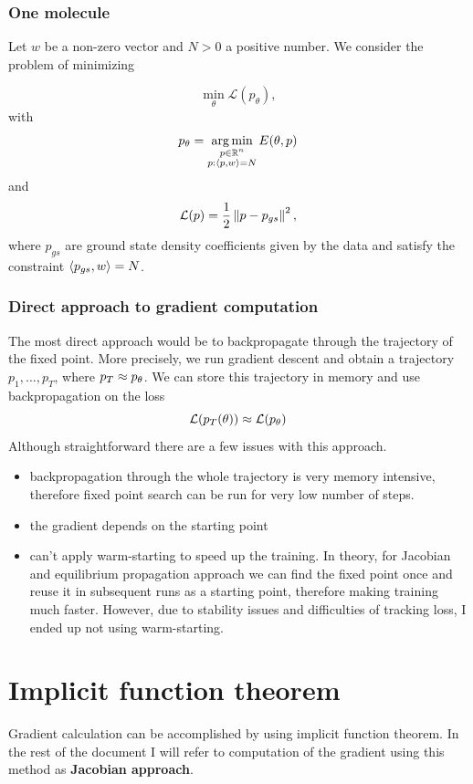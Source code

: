 \documentclass[a4paper,10pt]{report}
\begin{document}
\subsubsection{One molecule}
Let $w$ be a non-zero vector and $N>0$ a positive number.
We consider the problem of minimizing

\begin{equation}
 \min_\theta \mathcal{L}(p_\theta),
\end{equation}
with
\begin{equation}
p_\theta = \operatorname*{arg\,min}_{\substack{p \in \mathbb{R}^n \\ p: \langle p, w \rangle=N }} E(\theta, p)
\end{equation}
and
\begin{equation}
 \mathcal{L}(p) = \frac{1}{2} \left\|p-p_{gs}\right\|^2,
\end{equation}
where $p_{gs}$ are ground state density coefficients given by the data and satisfy the constraint $\langle p_{gs}, w \rangle = N$.


\subsubsection{Direct approach to gradient computation}
The most direct approach would be to backpropagate through the trajectory of the fixed point. More precisely, we run gradient descent and obtain a trajectory $p_1, \ldots, p_T$, where $p_T \approx p_\theta$. We can store this trajectory in memory and use backpropagation on the loss
\begin{equation}
 \mathcal{L}(p_T(\theta)) \approx \mathcal{L}(p_\theta)
\end{equation}
Although straightforward there are a few issues with this approach.
\begin{itemize}
 \item backpropagation through the whole trajectory is very memory intensive, therefore fixed point search can be run for very low number of steps.
 \item the gradient depends on the starting point
 \item can't apply warm-starting to speed up the training. In theory, for Jacobian and equilibrium propagation approach we can find the fixed point once and reuse it in subsequent runs as a starting point, therefore making training much faster.
 However, due to stability issues and difficulties of tracking loss, I ended up not using warm-starting.
\end{itemize}


\section{Implicit function theorem}
Gradient calculation can be accomplished by using implicit function theorem. In the rest of the document I will refer to computation of the gradient using this method as \textbf{Jacobian approach}.
\end{document}

